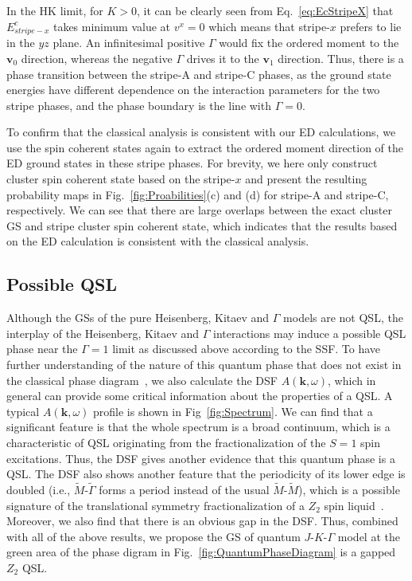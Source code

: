 \documentclass[aps,prb,reprint,amsfonts,amsmath,amssymb,showpacs,groupedaddress,superscriptaddress]{revtex4-1}
\begin{document}
In the HK limit, for $K>0$, it can be clearly seen from Eq.~\eqref{eq:EcStripeX} that $E_{stripe-x}^{c}$ takes minimum value at $v^x = 0$ which means that stripe-$x$ prefers to lie in the $yz$ plane. An infinitesimal positive $\Gamma$ would fix the ordered moment to the $\bm{v}_0$ direction, whereas the negative $\Gamma$ drives it to the $\bm{v}_1$ direction. Thus, there is a phase transition between the stripe-A and stripe-C phases, as the ground state energies have different dependence on the interaction parameters for the two stripe phases, and the phase boundary is the line with $\Gamma=0$.

To confirm that the classical analysis is consistent with our ED calculations, we use the spin coherent states again to extract the ordered moment direction of the ED ground states in these stripe phases. For brevity, we here only construct cluster spin coherent state based on the stripe-$x$ and present the resulting probability maps in Fig.~\ref{fig:Proabilities}(c) and (d) for stripe-A and stripe-C, respectively. We can see that there are large overlaps between the exact cluster GS and stripe cluster spin coherent state, which indicates that the results based on the ED calculation is consistent with the classical analysis.

\subsection{\label{subsec:QSL}Possible QSL}

Although the GSs of the pure Heisenberg, Kitaev and $\Gamma$ models are not QSL, the interplay of the Heisenberg, Kitaev and $\Gamma$ interactions may induce a possible QSL phase near the $\Gamma=1$ limit as discussed above according to the SSF. To have further understanding of the nature of this quantum phase that does not exist in the classical phase diagram~\cite{PhysRevB.92.165108}, we also calculate the DSF $A(\mathbf{k}, \omega)$, which in general can provide some critical information about the properties of a QSL. A typical $A(\mathbf{k}, \omega)$ profile is shown in Fig~\ref{fig:Spectrum}. We can find that a significant feature is that the whole spectrum is a broad continuum, which is a characteristic of QSL originating from the fractionalization of the $S=1$ spin excitations. Thus, the DSF gives another evidence that this quantum phase is a QSL. The DSF also shows another feature that the periodicity of its lower edge is doubled (i.e., $\tilde{M}$-$\tilde{\Gamma}$ forms a period instead of the usual $\tilde{M}$-$\tilde{M}$), which is a possible signature of the translational symmetry fractionalization of a $Z_{2}$ spin liquid~\cite{PhysRevB.90.121102,mei2015fractionalized,PhysRevB.99.205119}. Moreover, we also find that there is an obvious gap in the DSF. Thus, combined with all of the above results, we propose the GS of quantum $J$-$K$-$\Gamma$ model at the green area of the phase digram in Fig.~\ref{fig:QuantumPhaseDiagram} is a gapped $Z_{2}$ QSL.
\end{document}
